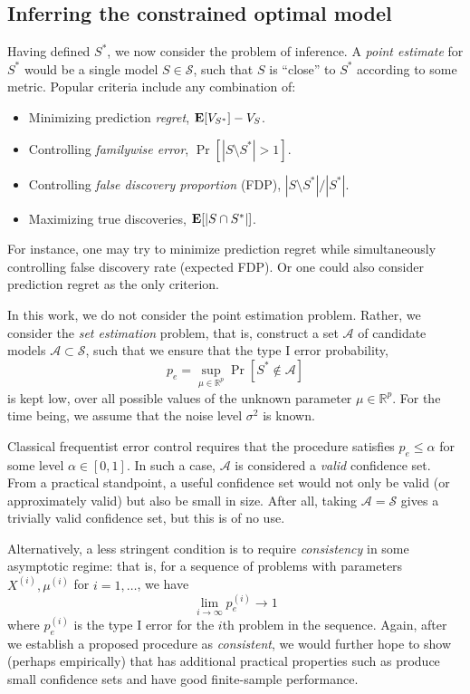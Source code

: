 \documentclass[12pt]{article}
\begin{document}
\subsection{Inferring the constrained optimal model}

Having defined $S^*$, we now consider the problem of inference.
A \emph{point estimate} for $S^*$ would be a single model
$S \in \mathcal{S}$, such that $S$ is ``close'' to $S^*$ according to some metric.
Popular criteria include any combination of:
\begin{itemize}
\item Minimizing prediction \emph{regret}, $\textbf{E}[V_{S^*}]-V_S$.
\item Controlling \emph{familywise error}, $\Pr[|S \setminus S^*| > 1]$.
\item Controlling \emph{false discovery proportion} (FDP), $|S \setminus S^*|/|S^*|$.
\item Maximizing true discoveries, $\textbf{E}[|S \cap S^*|]$.
\end{itemize}
For instance, one may try to minimize prediction regret while
simultaneously controlling false discovery rate (expected FDP).
Or one could also consider prediction regret as the only criterion.

In this work, we do not consider the point estimation problem.  Rather, we consider the \emph{set estimation} problem,
that is, construct a set $\mathcal{A}$ of candidate models $\mathcal{A} \subset \mathcal{S}$,
such that we ensure that the type I error probability,
\[
p_e = \sup_{\mu \in \mathbb{R}^p} \Pr[S^* \notin \mathcal{A}]
\]
is kept low, over all possible values of the unknown parameter $\mu \in \mathbb{R}^p$.
For the time being, we assume that the noise level $\sigma^2$ is known.

Classical frequentist error control requires that the procedure
satisfies $p_e \leq \alpha$ for some level $\alpha \in [0,1]$.  In
such a case, $\mathcal{A}$ is considered a \emph{valid} confidence
set.  From a practical standpoint, a useful confidence set would not
only be valid (or approximately valid) but also be small in size.
After all, taking $\mathcal{A} = \mathcal{S}$ gives a trivially valid
confidence set, but this is of no use.

Alternatively, a less stringent condition is to require \emph{consistency} in some asymptotic regime:
that is, for a sequence of problems with parameters $X^{(i)}, \mu^{(i)}$ for $i = 1,\hdots$, we have
\[
\lim_{i \to \infty} p_e^{(i)} \to 1
\]
where $p_e^{(i)}$ is the type I error for the $i$th problem in the
sequence.  Again, after we establish a proposed procedure
as \emph{consistent}, we would further hope to show (perhaps
empirically) that has additional practical properties such as produce
small confidence sets and have good finite-sample performance.
\end{document}
